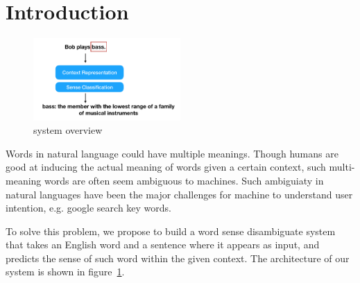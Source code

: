 \section{Introduction}

\begin{figure}\centering
\includegraphics[width=0.5\textwidth]{graphs/overview.png}
\caption{system overview}
  \label{fig:overview}
\end{figure}

Words in natural language could have multiple meanings. Though humans are good
at inducing the actual meaning of words given a certain context, such
multi-meaning words are often seem ambiguous to machines. Such ambiguiaty in
natural languages have been the major challenges for machine to understand user
intention, e.g. google search key words.

To solve this problem, we propose to build a word sense disambiguate system that
takes an English word and a sentence where it appears as input, and predicts the
sense of such word within the given context. 
The architecture of our system is shown in figure~\ref{fig:overview}.

